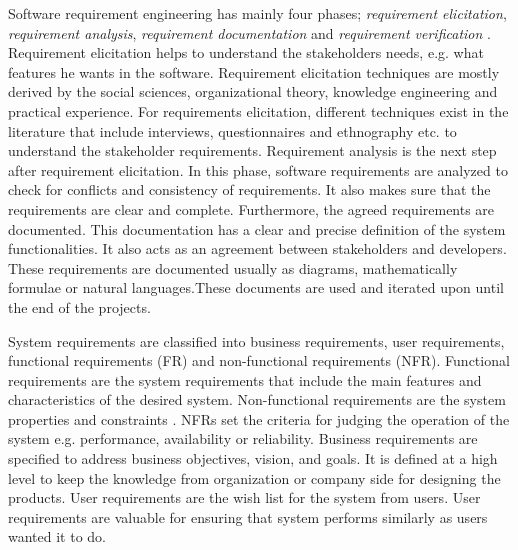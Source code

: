 	Software requirement engineering has mainly four phases; \emph{requirement
elicitation}, \emph{requirement analysis}, \emph{requirement documentation} and
\emph{requirement verification} \cite {Kotonya:1998}. Requirement elicitation
\cite{Coughlan:2002, Zowghi2005} helps to understand the
stakeholders needs, e.g. what features he wants in the software.
Requirement elicitation techniques are mostly derived by the social sciences,
organizational theory, knowledge engineering and practical experience. For
requirements elicitation, different techniques exist in the literature that
include interviews, questionnaires and ethnography etc. to understand the
stakeholder requirements.
Requirement analysis \cite{Nuseibeh:2000} is the next step
after requirement elicitation. In this phase, software requirements are analyzed
to check for conflicts and consistency of requirements. It also makes sure
that the requirements are clear and complete.
Furthermore, the agreed requirements are documented. This documentation has a clear and precise
definition of the system functionalities. It also acts as an agreement between
stakeholders and developers. These requirements are documented usually as diagrams, mathematically
formulae or natural languages.These documents are used and iterated upon until the end of the projects.

	System requirements are classified into business requirements, user
requirements, functional requirements (FR) and non-functional requirements (NFR). Functional
requirements are the system requirements that include the main features and
characteristics of the desired system. Non-functional requirements are the
system properties and constraints \cite{Davis:1993, Glinz}. NFRs set the
criteria for judging the operation of the system e.g.
performance, availability or reliability. Business requirements are specified to
address business objectives, vision, and goals. It is defined at a high level to
keep the knowledge from organization or company side for designing the products.
User requirements are the wish list for the system from users.
User requirements are valuable for ensuring that system performs similarly as users wanted it to do.

